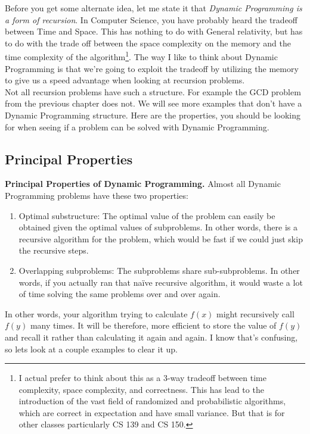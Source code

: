 \documentclass[10pt]{article}
\theoremstyle{plain}
\theoremstyle{definition}
\numberwithin{equation}{section}
\numberwithin{figure}{section}
\begin{document}
Before you get some alternate idea, let me state it that \emph{Dynamic Programming is a form of recursion}. In Computer Science, you have probably heard the tradeoff between Time and Space. This has nothing to do with General relativity, but has to do with the trade off between the space complexity on the memory and the time complexity of the algorithm\footnote{I actual prefer to think about this as a 3-way tradeoff between time complexity, space complexity, and correctness. This has lead to the introduction of the vast field of randomized and probabilistic algorithms, which are correct in expectation and have small variance. But that is for other classes particularly CS 139 and CS 150.}. The way I like to think about Dynamic Programming is that we're going to exploit the tradeoff by utilizing the memory to give us a speed advantage when looking at recursion problems. \\

\noindent Not all recursion problems have such a structure. For example the GCD problem from the previous chapter does not. We will see more examples that don't have a Dynamic Programming structure. Here are the properties, you should be looking for when seeing if a problem can be solved with Dynamic Programming.

\subsection{Principal Properties}

\begin{framed}
\noindent \textbf{Principal Properties of Dynamic Programming.} Almost all Dynamic Programming problems have these two properties:
\begin{enumerate}
\item Optimal substructure: The optimal value of the problem can easily be obtained given the optimal values of subproblems. In other words, there is a recursive algorithm for the problem, which would be fast if we could just skip the recursive steps.
\item Overlapping subproblems: The subproblems share sub-subproblems. In other words, if you actually ran that na{\"i}ve recursive algorithm, it would waste a lot of time solving the same problems over and over again.
\end{enumerate}
\end{framed}

\noindent \noindent In other words, your algorithm trying to calculate $f(x)$ might recursively call $f(y)$ many times. It will be therefore, more efficient to store the value of $f(y)$ and recall it rather than calculating it again and again. I know that's confusing, so lets look at a couple examples to clear it up. 
\end{document}
